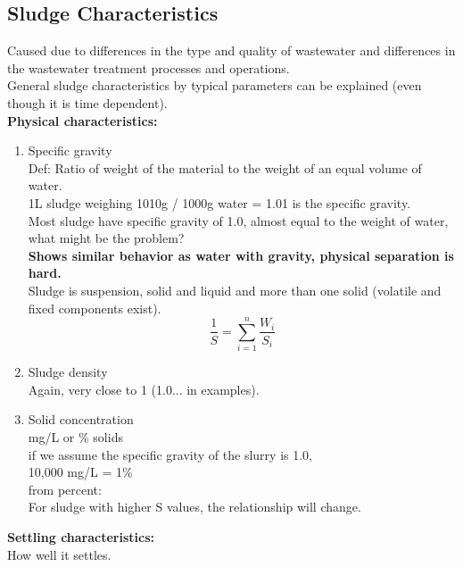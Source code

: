 \documentclass[12pt]{article}
\begin{document}
\subsection{Sludge Characteristics}
Caused due to differences in the type and quality of wastewater and differences in the wastewater treatment processes and operations.\\
General sludge characteristics by typical parameters can be explained (even though it is time dependent).\\
\textbf{Physical characteristics:}
\begin{enumerate}
    \item Specific gravity\\
    Def: Ratio of  weight of the material to the weight of an equal volume of water.\\
    1L sludge weighing 1010g / 1000g water = 1.01 is the specific gravity.\\
    Most sludge have specific gravity of 1.0, almost equal to the weight of water, what might be the problem?\\
    \textbf{Shows similar behavior as water with gravity, physical separation is hard.}\\
    Sludge is suspension, solid and liquid and more than one solid (volatile and fixed components exist).
    \[\frac{1}{S}= \sum_{i=1}^{n} \frac{W_i}{S_i}\]
    \item Sludge density\\
    Again, very close to 1 (1.0... in examples).
    \item Solid concentration\\
    mg/L or \% solids\\
    if we assume the specific gravity of the slurry is 1.0,\\
    10,000 mg/L = 1\%\\ %
    from percent:\\
    For sludge with higher S values, the relationship will change.
    \end{enumerate}
\textbf{Settling characteristics:}\\
    How well it settles.
\end{document}
